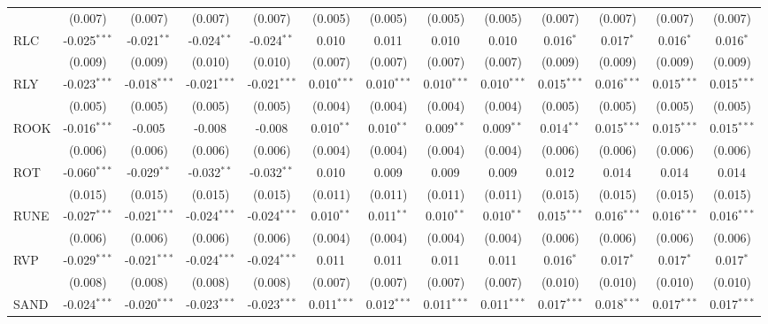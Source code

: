 \begin{table}[!htbp]
\begin{tabular}{@{\extracolsep{5pt}}lcccccccccccc}
  & (0.007) & (0.007) & (0.007) & (0.007) & (0.005) & (0.005) & (0.005) & (0.005) & (0.007) & (0.007) & (0.007) & (0.007) \\
 RLC & -0.025$^{***}$ & -0.021$^{**}$ & -0.024$^{**}$ & -0.024$^{**}$ & 0.010$^{}$ & 0.011$^{}$ & 0.010$^{}$ & 0.010$^{}$ & 0.016$^{*}$ & 0.017$^{*}$ & 0.016$^{*}$ & 0.016$^{*}$ \\
  & (0.009) & (0.009) & (0.010) & (0.010) & (0.007) & (0.007) & (0.007) & (0.007) & (0.009) & (0.009) & (0.009) & (0.009) \\
 RLY & -0.023$^{***}$ & -0.018$^{***}$ & -0.021$^{***}$ & -0.021$^{***}$ & 0.010$^{***}$ & 0.010$^{***}$ & 0.010$^{***}$ & 0.010$^{***}$ & 0.015$^{***}$ & 0.016$^{***}$ & 0.015$^{***}$ & 0.015$^{***}$ \\
  & (0.005) & (0.005) & (0.005) & (0.005) & (0.004) & (0.004) & (0.004) & (0.004) & (0.005) & (0.005) & (0.005) & (0.005) \\
 ROOK & -0.016$^{***}$ & -0.005$^{}$ & -0.008$^{}$ & -0.008$^{}$ & 0.010$^{**}$ & 0.010$^{**}$ & 0.009$^{**}$ & 0.009$^{**}$ & 0.014$^{**}$ & 0.015$^{***}$ & 0.015$^{***}$ & 0.015$^{***}$ \\
  & (0.006) & (0.006) & (0.006) & (0.006) & (0.004) & (0.004) & (0.004) & (0.004) & (0.006) & (0.006) & (0.006) & (0.006) \\
 ROT & -0.060$^{***}$ & -0.029$^{**}$ & -0.032$^{**}$ & -0.032$^{**}$ & 0.010$^{}$ & 0.009$^{}$ & 0.009$^{}$ & 0.009$^{}$ & 0.012$^{}$ & 0.014$^{}$ & 0.014$^{}$ & 0.014$^{}$ \\
  & (0.015) & (0.015) & (0.015) & (0.015) & (0.011) & (0.011) & (0.011) & (0.011) & (0.015) & (0.015) & (0.015) & (0.015) \\
 RUNE & -0.027$^{***}$ & -0.021$^{***}$ & -0.024$^{***}$ & -0.024$^{***}$ & 0.010$^{**}$ & 0.011$^{**}$ & 0.010$^{**}$ & 0.010$^{**}$ & 0.015$^{***}$ & 0.016$^{***}$ & 0.016$^{***}$ & 0.016$^{***}$ \\
  & (0.006) & (0.006) & (0.006) & (0.006) & (0.004) & (0.004) & (0.004) & (0.004) & (0.006) & (0.006) & (0.006) & (0.006) \\
 RVP & -0.029$^{***}$ & -0.021$^{***}$ & -0.024$^{***}$ & -0.024$^{***}$ & 0.011$^{}$ & 0.011$^{}$ & 0.011$^{}$ & 0.011$^{}$ & 0.016$^{*}$ & 0.017$^{*}$ & 0.017$^{*}$ & 0.017$^{*}$ \\
  & (0.008) & (0.008) & (0.008) & (0.008) & (0.007) & (0.007) & (0.007) & (0.007) & (0.010) & (0.010) & (0.010) & (0.010) \\
 SAND & -0.024$^{***}$ & -0.020$^{***}$ & -0.023$^{***}$ & -0.023$^{***}$ & 0.011$^{***}$ & 0.012$^{***}$ & 0.011$^{***}$ & 0.011$^{***}$ & 0.017$^{***}$ & 0.018$^{***}$ & 0.017$^{***}$ & 0.017$^{***}$ \\

\end{tabular}
\end{table}
